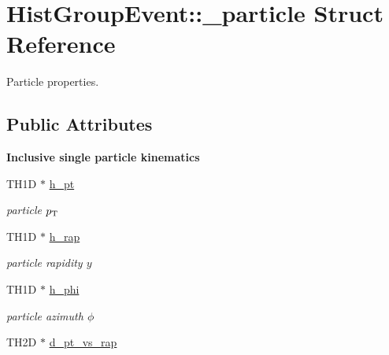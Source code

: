\hypertarget{structHistGroupEvent_1_1__particle}{
\section{Hist\-Group\-Event::\_\-particle Struct Reference}
\label{structHistGroupEvent_1_1__particle}
}
Particle properties.  


\subsection*{Public Attributes}
\begin{Indent}{\bf Inclusive single particle kinematics}\par
\begin{CompactItemize}
\item 
\hypertarget{structHistGroupEvent_1_1__particle_c9273a10435e9d450b0552b33748da70}{
TH1D $\ast$ \hyperlink{structHistGroupEvent_1_1__particle_c9273a10435e9d450b0552b33748da70}{h\_\-pt}}
\label{structHistGroupEvent_1_1__particle_c9273a10435e9d450b0552b33748da70}

\begin{CompactList}\small\item\em particle $p_{\rm T}$ \item\end{CompactList}\item 
\hypertarget{structHistGroupEvent_1_1__particle_ee663d6faed0012e30dd00596388fa15}{
TH1D $\ast$ \hyperlink{structHistGroupEvent_1_1__particle_ee663d6faed0012e30dd00596388fa15}{h\_\-rap}}
\label{structHistGroupEvent_1_1__particle_ee663d6faed0012e30dd00596388fa15}

\begin{CompactList}\small\item\em particle rapidity $y$ \item\end{CompactList}\item 
\hypertarget{structHistGroupEvent_1_1__particle_0b50f1f9a2379e0f4e995eb90c705e21}{
TH1D $\ast$ \hyperlink{structHistGroupEvent_1_1__particle_0b50f1f9a2379e0f4e995eb90c705e21}{h\_\-phi}}
\label{structHistGroupEvent_1_1__particle_0b50f1f9a2379e0f4e995eb90c705e21}

\begin{CompactList}\small\item\em particle azimuth $\phi$ \item\end{CompactList}\item 
\hypertarget{structHistGroupEvent_1_1__particle_14374b4f9ad31372954c576b77d774e3}{
TH2D $\ast$ \hyperlink{structHistGroupEvent_1_1__particle_14374b4f9ad31372954c576b77d774e3}{d\_\-pt\_\-vs\_\-rap}}
\label{structHistGroupEvent_1_1__particle_14374b4f9ad31372954c576b77d774e3}


\end{CompactItemize}
\end{Indent}
